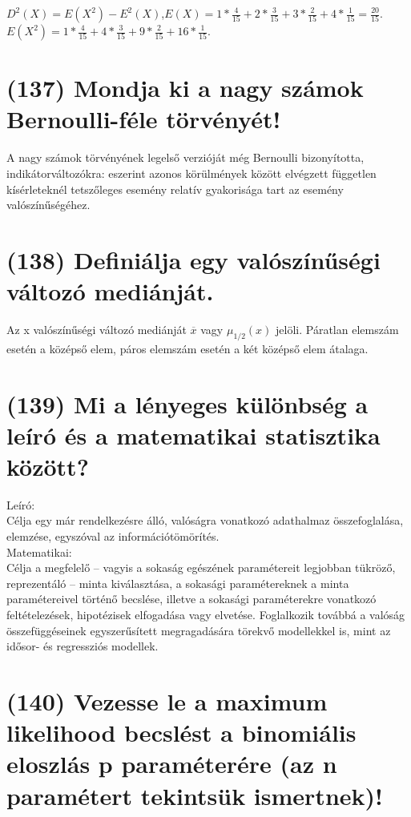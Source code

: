 \documentclass[12p]{article}
\begin{document}
$D^2(X) = E(X^2) - E^2(X)$,$E(X) = 1 * \frac{4}{15} + 2 * \frac{3}{15} + 3 * \frac{2}{15} + 4 * \frac{1}{15} = \frac{20}{15}$.\\
$E(X^2) = 1 * \frac{4}{15} + 4 * \frac{3}{15} + 9 * \frac{2}{15} + 16 * \frac{1}{15}$.

\section{(137) Mondja ki a nagy számok Bernoulli-féle törvényét!}

A nagy számok törvényének legelső verzióját
még Bernoulli bizonyította,
indikátorváltozókra: eszerint azonos
körülmények között elvégzett független
kísérleteknél tetszőleges esemény relatív
gyakorisága tart az esemény
valószínűségéhez.

\section{(138) Definiálja egy valószínűségi változó mediánját.}

Az x valószínűségi változó mediánját $\overline{x}$ vagy $\mu_{1/2}(x)$ jelöli.
Páratlan elemszám esetén a középső elem, páros elemszám esetén a két középső elem átalaga.

\section{(139) Mi a lényeges különbség a leíró és a matematikai statisztika között?}

Leíró:\\
Célja egy már rendelkezésre álló, valóságra vonatkozó adathalmaz összefoglalása, elemzése, egyszóval az információtömörítés.\\
Matematikai:\\
Célja a megfelelő – vagyis a sokaság egészének paramétereit legjobban tükröző, reprezentáló – minta kiválasztása, a sokasági paramétereknek a minta paramétereivel történő becslése, illetve a sokasági paraméterekre vonatkozó feltételezések, hipotézisek elfogadása vagy elvetése. Foglalkozik továbbá a valóság összefüggéseinek egyszerűsített megragadására törekvő modellekkel is, mint az idősor- és regressziós modellek.

\section{(140) Vezesse le a maximum likelihood becslést a binomiális eloszlás p paraméterére (az n paramétert tekintsük ismertnek)!}
\end{document}
